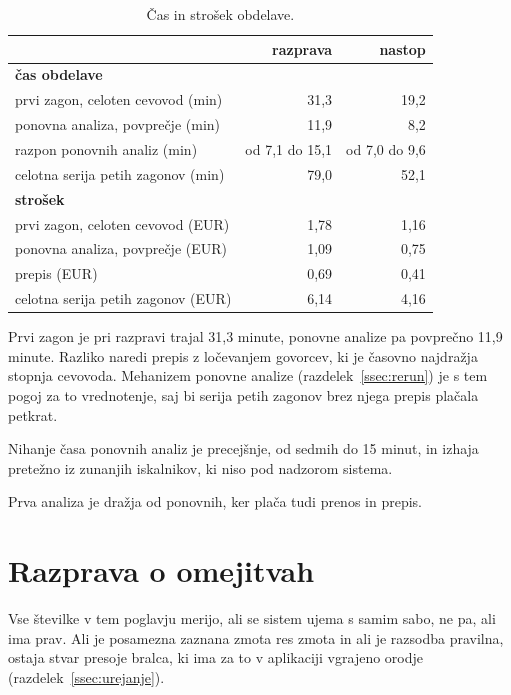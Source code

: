 \documentclass[a4paper, 12pt]{book}
\begin{document}
\begin{table}[htbp]
\centering
\begin{tabular}{lrr}
\toprule
& razprava & nastop \\
\midrule
\multicolumn{3}{l}{\textbf{čas obdelave}} \\
prvi zagon, celoten cevovod (min)   & 31,3 & 19,2 \\
ponovna analiza, povprečje (min)    & 11,9 & 8,2 \\
razpon ponovnih analiz (min)        & od 7,1 do 15,1 & od 7,0 do 9,6 \\
celotna serija petih zagonov (min)  & 79,0 & 52,1 \\
\midrule
\multicolumn{3}{l}{\textbf{strošek}} \\
prvi zagon, celoten cevovod (EUR)   & 1,78 & 1,16 \\
ponovna analiza, povprečje (EUR)    & 1,09 & 0,75 \\
prepis (EUR)                        & 0,69 & 0,41 \\
celotna serija petih zagonov (EUR)  & 6,14 & 4,16 \\
\bottomrule
\end{tabular}
\caption{Čas in strošek obdelave.}
\label{tbl:strosek}
\end{table}

Prvi zagon je pri razpravi trajal 31,3 minute, ponovne analize pa povprečno 11,9
minute. Razliko naredi prepis z ločevanjem govorcev, ki je časovno najdražja
stopnja cevovoda. Mehanizem ponovne analize (razdelek~\ref{ssec:rerun}) je s tem
pogoj za to vrednotenje, saj bi serija petih zagonov brez njega prepis plačala
petkrat.

Nihanje časa ponovnih analiz je precejšnje, od sedmih do 15 minut, in izhaja
pretežno iz zunanjih iskalnikov, ki niso pod nadzorom sistema.

Prva analiza je dražja od ponovnih, ker plača tudi prenos in prepis.

\section{Razprava o omejitvah}
\label{sec:razprava}

Vse številke v tem poglavju merijo, ali se sistem ujema s samim sabo, ne pa,
ali ima prav. Ali je posamezna zaznana zmota res zmota in ali je razsodba
pravilna, ostaja stvar presoje bralca, ki ima za to v aplikaciji vgrajeno
orodje (razdelek~\ref{ssec:urejanje}).
\end{document}
